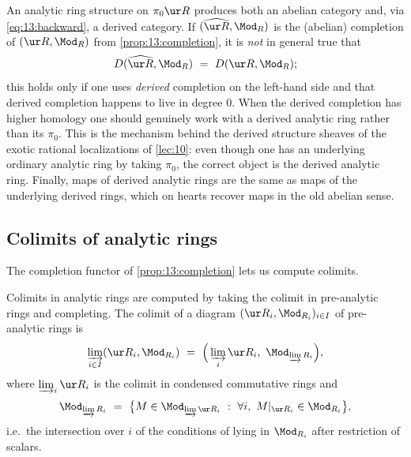 \begin{remark}
\label{rmk:13:derived-cat-warning}
An analytic ring structure on $\pi_0\ur R$ produces both an abelian category and,
via \eqref{eq:13:backward}, a derived category. If
$(\widehat{\ur R},\Mod_R)$ is the (abelian) completion of $(\ur R,\Mod_R)$ from
\cref{prop:13:completion}, it is \emph{not} in general true that
\begin{equation*}
D(\widehat{\ur R},\Mod_R)\ =\ D(\ur R,\Mod_R);
\end{equation*}
this holds only if one uses \emph{derived} completion on the left-hand side and
that derived completion happens to live in degree $0$. When the derived
completion has higher homology one should genuinely work with a derived analytic
ring rather than its $\pi_0$. This is the mechanism behind the derived structure
sheaves of the exotic rational localizations of \cref{lec:10}: even though one has
an underlying ordinary analytic ring by taking $\pi_0$, the correct object is the
derived analytic ring. Finally, maps of derived analytic rings are the same as
maps of the underlying derived rings, which on hearts recover maps in the old
abelian sense.
\end{remark}

\subsection{Colimits of analytic rings}

The completion functor of \cref{prop:13:completion} lets us compute colimits.

\begin{proposition}
\label{prop:13:colimits}
Colimits in analytic rings are computed by taking the colimit in pre-analytic
rings and completing. The colimit of a diagram $(\ur R_i,\Mod_{R_i})_{i\in I}$ of
pre-analytic rings is
\begin{equation}
\label{eq:13:colimit-formula}
\varinjlim_{i\in I}(\ur R_i,\Mod_{R_i})\ =\ \Big(\varinjlim_i \ur R_i,\ \Mod_{\varinjlim R_i}\Big),
\end{equation}
where $\varinjlim_i\ur R_i$ is the colimit in condensed commutative rings and
\begin{equation}
\label{eq:13:colimit-modules}
\Mod_{\varinjlim R_i}\ =\ \big\{M\in\Mod_{\varinjlim \ur R_i}\ :\ \forall i,\ M|_{\ur R_i}\in\Mod_{R_i}\big\},
\end{equation}
i.e.\ the intersection over $i$ of the conditions of lying in $\Mod_{R_i}$ after
restriction of scalars.
\end{proposition}


